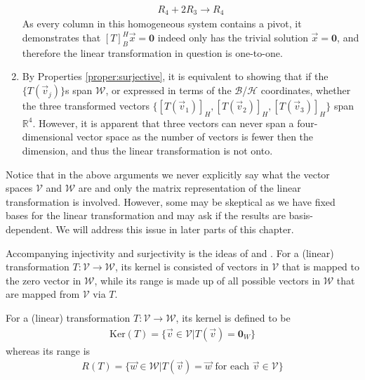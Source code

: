 \begin{solution}
\begin{enumerate}[label=(\alph*)]
\begin{align*}
    R_4 + 2R_3 \to R_4
    \end{align*}
    As every column in this homogeneous system contains a pivot, it demonstrates that $[T]_B^H\vec{x} = \textbf{0}$ indeed only has the trivial solution $\vec{x} = \textbf{0}$, and therefore the linear transformation in question is one-to-one.
    \item By Properties \ref{proper:surjective}, it is equivalent to showing that if the $\{T(\vec{v}_j)\}$s span $\mathcal{W}$, or expressed in terms of the $\mathcal{B}$/$\mathcal{H}$ coordinates, whether the three transformed vectors $\{[T(\vec{v}_1)]_H, [T(\vec{v}_2)]_H, [T(\vec{v}_3)]_H\}$ span $\mathbb{R}^4$. However, it is apparent that three vectors can never span a four-dimensional vector space as the number of vectors is fewer then the dimension, and thus the linear transformation is not onto.
\end{enumerate}
Notice that in the above arguments we never explicitly say what the vector spaces $\mathcal{V}$ and $\mathcal{W}$ are and only the matrix representation of the linear transformation is involved. However, some may be skeptical as we have fixed bases for the linear transformation and may ask if the results are basis-dependent. We will address this issue in later parts of this chapter.
\end{solution}
Accompanying injectivity and surjectivity is the ideas of  and . For a (linear) transformation $T: \mathcal{V} \to \mathcal{W}$, its kernel is consisted of vectors in $\mathcal{V}$ that is mapped to the zero vector in $\mathcal{W}$, while its range is made up of all possible vectors in $\mathcal{W}$ that are mapped from $\mathcal{V}$ via $T$.
\begin{defn}
\label{defn:kernelrange}
For a (linear) transformation $T: \mathcal{V} \to \mathcal{W}$, its kernel is defined to be
\begin{align*}
\text{Ker}(T) = \{\vec{v} \in \mathcal{V} | T(\vec{v}) = \textbf{0}_W\}
\end{align*}
whereas its range is
\begin{align*}
R(T) = \{\vec{w} \in \mathcal{W} | T(\vec{v}) = \vec{w} \text{ for each } \vec{v} \in \mathcal{V}\}    
\end{align*}
\end{defn}
